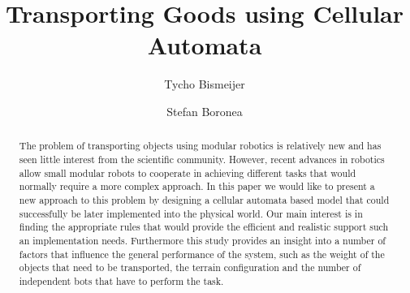\documentclass[runningheads]{llncs}
\title{Transporting Goods using Cellular Automata}
\author{Tycho Bismeijer\inst{1} \and Stefan Boronea\inst{1}}
\institute{Vrije Universiteit Amsterdam}
\date{}
\begin{document}
\maketitle

\begin{abstract}
The problem of transporting objects using modular robotics is relatively new and has seen little interest from the scientific community. However, recent advances in robotics allow small modular robots to cooperate in achieving different tasks that would normally require a more complex approach. In this paper we would like to present a new approach to this problem by designing a cellular automata based model that could successfully be later implemented into the physical world. Our main interest is in finding the appropriate rules that would provide the efficient and realistic support such an implementation needs. Furthermore this study provides an insight into a number of factors that influence the general performance of the system, such as the weight of the objects that need to be transported, the terrain configuration and the number of independent bots that have to perform the task. 
\end{abstract}















\end{document}
